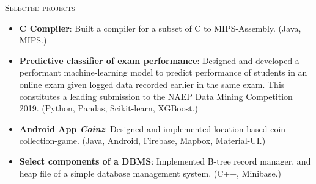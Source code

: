 \documentclass[11pt]{article}
\begin{document}
\textsc{Selected projects}
\begin{itemize}
    \item \textbf{C Compiler}:
        Built a compiler for a subset of C to MIPS-Assembly. (Java, MIPS.)
    \item \textbf{Predictive classifier of exam performance}:
        Designed and developed a performant machine-learning model to predict performance
        of students in an online exam given logged data recorded earlier in the same exam.
        This constitutes a leading submission to the NAEP Data Mining Competition 2019.
        (Python, Pandas, Scikit-learn, XGBoost.)
    \item \textbf{Android App \emph{Coinz}}:
        Designed and implemented location-based coin collection-game. (Java, Android,
        Firebase, Mapbox, Material-UI.)
    \item \textbf{Select components of a DBMS}:
        Implemented B-tree record manager, and heap file of a simple database management
        system. (C++, Minibase.)
\end{itemize}
\end{document}
